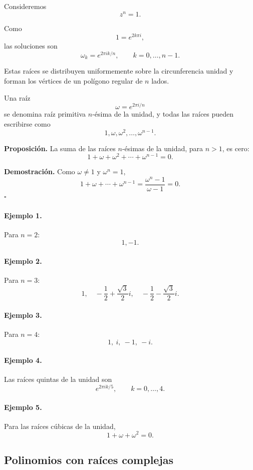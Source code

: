 Consideremos
\[
z^n=1.
\]

Como
\[
1=e^{2k\pi i},
\]
las soluciones son
\[
\boxed{
\omega_k=e^{2\pi i k/n},
\qquad
k=0,\ldots,n-1.
}
\]

Estas raíces se distribuyen uniformemente sobre la circunferencia unidad y
forman los vértices de un polígono regular de $n$ lados.

Una raíz
\[
\omega=e^{2\pi i/n}
\]
se denomina raíz primitiva $n$-ésima de la unidad, y todas las raíces pueden
escribirse como
\[
1,\omega,\omega^2,\ldots,\omega^{n-1}.
\]

\textbf{Proposición.}
La suma de las raíces $n$-ésimas de la unidad, para $n>1$, es cero:
\[
\boxed{
1+\omega+\omega^2+\cdots+\omega^{n-1}=0.
}
\]

\textbf{Demostración.}
Como $\omega\neq1$ y $\omega^n=1$,
\[
1+\omega+\cdots+\omega^{n-1}
=
\frac{\omega^n-1}{\omega-1}
=
0.
\]
\hfill$\square$

\paragraph{Ejemplo 1.}
Para $n=2$:
\[
1,-1.
\]

\paragraph{Ejemplo 2.}
Para $n=3$:
\[
1,\quad
-\frac12+\frac{\sqrt3}{2}i,\quad
-\frac12-\frac{\sqrt3}{2}i.
\]

\paragraph{Ejemplo 3.}
Para $n=4$:
\[
1,\ i,\ -1,\ -i.
\]

\paragraph{Ejemplo 4.}
Las raíces quintas de la unidad son
\[
e^{2\pi ik/5},
\qquad
k=0,\ldots,4.
\]

\paragraph{Ejemplo 5.}
Para las raíces cúbicas de la unidad,
\[
1+\omega+\omega^2=0.
\]

\subsection{Polinomios con raíces complejas}

